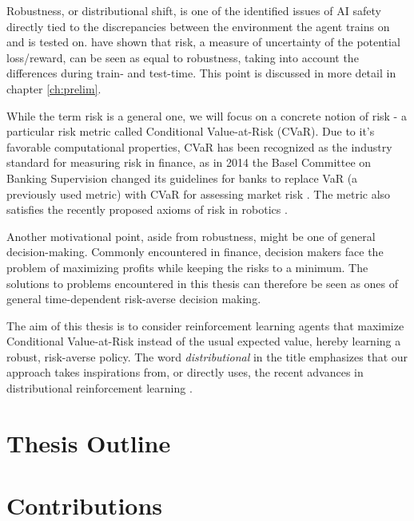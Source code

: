 Robustness, or distributional shift, is one of the identified issues of AI safety \citep{leike2017ai, amodei2016concrete, leike2017ai} directly tied to the discrepancies between the environment the agent trains on and is tested on. \citet{chow2015risk} have shown that risk, a measure of uncertainty of the potential loss/reward, can be seen as equal to robustness, taking into account the differences during train- and test-time. This point is discussed in more detail in chapter \ref{ch:prelim}.

While the term risk is a general one, we will focus on a concrete notion of risk - a particular risk metric called Conditional Value-at-Risk (CVaR). 
Due to it's favorable computational properties, CVaR has been recognized as the industry standard for measuring risk in finance, as in 2014 the Basel Committee on Banking Supervision changed its guidelines for banks to replace VaR (a previously used metric) with CVaR for assessing market risk \citep{basel2013fundamental}. The metric also satisfies the recently proposed axioms of risk in robotics \citep{majumdar2017should}.

Another motivational point, aside from robustness, might be one of general decision-making. Commonly encountered in finance, decision makers face the problem of maximizing profits while keeping the risks to a minimum. The solutions to problems encountered in this thesis can therefore be seen as ones of general time-dependent risk-averse decision making.

The aim of this thesis is to consider reinforcement learning agents that maximize Conditional Value-at-Risk instead of the usual expected value, hereby learning a robust, risk-averse policy. The word \textit{distributional} in the title emphasizes that our approach takes inspirations from, or directly uses, the recent advances in distributional reinforcement learning \citep{bellemare2017distributional, dabney2017distributional}.



\section{Thesis Outline}






\section{Contributions}


